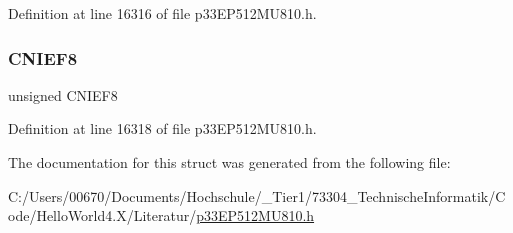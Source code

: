 Definition at line 16316 of file p33\+E\+P512\+M\+U810.\+h.

\mbox{\label{structtag_c_n_e_n_f_b_i_t_s_a500a06db9b7cdc49786b1a51551b291d}} 
\subsubsection{\texorpdfstring{C\+N\+I\+E\+F8}{CNIEF8}}
{\footnotesize\ttfamily unsigned C\+N\+I\+E\+F8}



Definition at line 16318 of file p33\+E\+P512\+M\+U810.\+h.



The documentation for this struct was generated from the following file\+:\begin{DoxyCompactItemize}
\item 
C\+:/\+Users/00670/\+Documents/\+Hochschule/\+\_\+\+Tier1/73304\+\_\+\+Technische\+Informatik/\+Code/\+Hello\+World4.\+X/\+Literatur/\hyperlink{p33_e_p512_m_u810_8h}{p33\+E\+P512\+M\+U810.\+h}\end{DoxyCompactItemize}
